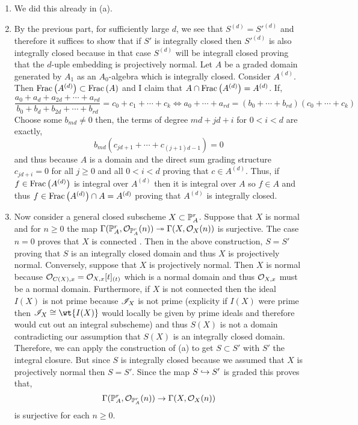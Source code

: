 \documentclass[12pt]{article}
\begin{document}
\begin{enumerate}
\item We did this already in (a).

\item By the previous part, for sufficiently large $d$, we see that $S^{(d)} = S'^{(d)}$ and therefore it suffices to show that if $S'$ is integrally closed then $S'^{(d)}$ is also integrally closed because in that case $S^{(d)}$ will be integrall closed proving that the $d$-uple embedding is projectively normal. Let $A$ be a graded domain generated by $A_1$ as an $A_0$-algebra which is integrally closed. Consider $A^{(d)}$. Then $\Frac{A^{(d)}} \subset \Frac{A}$ and I claim that $A \cap \Frac{A^{(d)}} = A^{(d)}$. If,
\[ \frac{a_0 + a_d + a_{2d} + \cdots + a_{rd}}{b_0 + b_d + b_{2d} + \cdots + b_{rd}} = c_0 + c_1 + \cdots + c_k  \iff a_0 + \cdots + a_{rd} = (b_0 + \cdots + b_{rd}) (c_0 + \cdots + c_k) \]
Choose some $b_{md} \neq 0$ then, the terms of degree $md + jd + i$ for $0 < i < d$ are exactly,
\[ b_{md} (c_{jd + 1}  + \cdots + c_{(j+1)d - 1}) = 0 \]
and thus because $A$ is a domain and the direct sum grading structure $c_{jd + i} = 0$ for all $j \ge 0$ and all $0 < i < d$ proving that $c \in A^{(d)}$. Thus, if $f \in \Frac{A^{(d)}}$ is integral over $A^{(d)}$ then it is integral over $A$ so $f \in A$ and thus $f \in \Frac{A^{(d)}} \cap A = A^{(d)}$ proving that $A^{(d)}$ is integrally closed.

\item Now consider a general closed subscheme $X \subset \P^r_A$. Suppose that $X$ is normal and for $n \ge 0$ the map $\Gamma(\P^r_A, \struct{\P^r_A}(n)) \onto \Gamma(X, \struct{X}(n))$ is surjective. The case $n = 0$ proves that $X$ is connected . Then in the above construction, $S = S'$ proving that $S$ is an integrally closed domain and thus $X$ is projectively normal. Conversely, suppose that $X$ is projectively normal. Then $X$ is normal because $\stalk{C(X)}{x} = \stalk{X}{x}[t]_{(t)}$ which is a normal domain and thus $\stalk{X}{x}$ must be a normal domain. Furthermore, if $X$ is not connected then the ideal $I(X)$ is not prime because $\I_X$ is not prime (explicity if $I(X)$ were prime then $\I_X \cong \wt{I(X)}$ would locally be given by prime ideals and therefore would cut out an integral subscheme) and thus $S(X)$ is not a domain contradicting our assumption that $S(X)$ is an integrally closed domain. Therefore, we can apply the construction of (a) to get $S \subset S'$ with $S'$ the integral closure. But since $S$ is integrally closed because we assumed that $X$ is projectively normal then $S = S'$. Since the map $S \embed S'$ is graded this proves that,
\[ \Gamma(\P^r_A, \struct{\P^r_A}(n)) \to \Gamma(X, \struct{X}(n)) \]
is surjective for each $n \ge 0$.
\end{enumerate}
\end{document}
